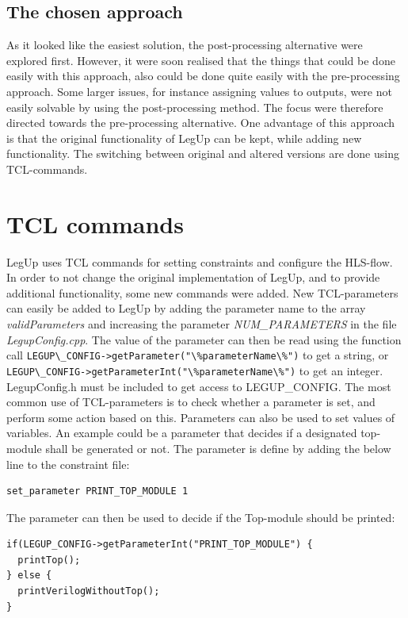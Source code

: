 \subsection{The chosen approach}
As it looked like the easiest solution, the post-processing alternative were explored first. However, it were soon realised that the things that could be done easily with this approach, also could be done quite easily with the pre-processing approach. Some larger issues, for instance assigning values to outputs, were not easily solvable by using the post-processing method. The focus were therefore directed towards the pre-processing alternative. One advantage of this approach is that the original functionality of LegUp can be kept, while adding new functionality. The switching between original and altered versions are done using TCL-commands.

\section{TCL commands}
LegUp uses TCL commands for setting constraints and configure the HLS-flow. In order to not change the original implementation of LegUp, and to provide additional functionality, some new commands were added. New TCL-parameters can easily be added to LegUp by adding the parameter name to the array \textit{validParameters} and increasing the parameter \textit{NUM\_PARAMETERS} in the file \textit{LegupConfig.cpp}. The value of the parameter can then be read using the function call \verb!LEGUP\_CONFIG->getParameter("\%parameterName\%")! to get a string, or \verb!LEGUP\_CONFIG->getParameterInt("\%parameterName\%")! to get an integer. LegupConfig.h must be included to get access to LEGUP\_CONFIG. The most common use of TCL-parameters is to check whether a parameter is set, and perform some action based on this. Parameters can also be used to set values of variables. An example could be a parameter that decides if a designated top-module shall be generated or not. The parameter is define by adding the below line to the constraint file:

\begin{verbatim}
set_parameter PRINT_TOP_MODULE 1
\end{verbatim}
The parameter can then be used to decide if the Top-module should be printed:
\lstset{language=C++,style=Cstyle}
\begin{lstlisting}
if(LEGUP_CONFIG->getParameterInt("PRINT_TOP_MODULE") {
  printTop();
} else {
  printVerilogWithoutTop();
}
\end{lstlisting}

